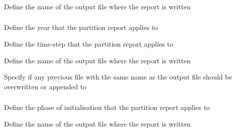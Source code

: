 \subsubsection[Print the spatial co-ordinates of each spatial cell (i.e., row and column labels of each spatial cell) of the spatial structure]{}

 {Define the name of the output file where the report is written}

\subsubsection[Print the partition]{}

 {Define the year that the partition report applies to}

 {Define the time-step that the partition report applies to}

 {Define the name of the output file where the report is written}

 {Specify if any previous file with the same name as the output file should be overwritten or appended to}

\subsubsection[Print the partition at initialisation]{}

 {Define the phase of initialisation that the partition report applies to}

 {Define the name of the output file where the report is written}

